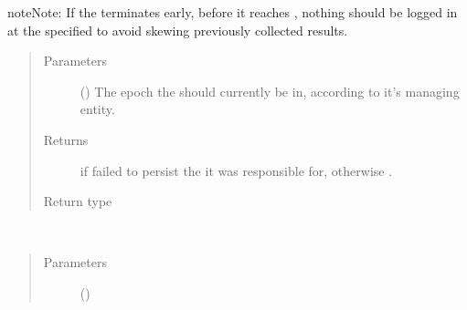 \documentclass[letterpaper,10pt,english]{sphinxmanual}
\begin{document}
\begin{fulllineitems}
\begin{fulllineitems}
\begin{sphinxadmonition}{note}{Note:}
If the  terminates early, before it reaches
{\hyperref[\detokenize{app.domain:app.domain.master_servers.Master.MAX_EPOCHS}]{}},
nothing should be logged in
{\hyperref[\detokenize{app.domain.helpers:app.domain.helpers.smart_dataclasses.LoggingData}]{}}
at the specified  to avoid skewing previously
collected results.
\end{sphinxadmonition}
\begin{quote}\begin{description}
\item[{Parameters}] \leavevmode
{} () \textendash{} The epoch the  should currently be in, according
to it’s managing  entity.

\item[{Returns}] \leavevmode
{} if  failed to persist the  it
was responsible for, otherwise .

\item[{Return type}] \leavevmode
{}

\end{description}\end{quote}

\end{fulllineitems}


\begin{fulllineitems}
\label{\detokenize{app.domain:app.domain.cluster_groups.NewscastCluster.log_aggregation}}~\begin{quote}\begin{description}
\item[{Parameters}] \leavevmode
{} () \textendash{} 


\end{description}
\end{quote}
\end{fulllineitems}
\end{fulllineitems}
\end{document}
